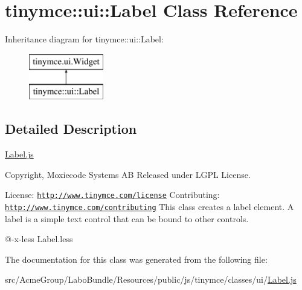 \hypertarget{classtinymce_1_1ui_1_1_label}{\section{tinymce\+:\+:ui\+:\+:Label Class Reference}
\label{classtinymce_1_1ui_1_1_label}
}
Inheritance diagram for tinymce\+:\+:ui\+:\+:Label\+:\begin{figure}[H]
\begin{center}
\leavevmode
\includegraphics[height=2.000000cm]{classtinymce_1_1ui_1_1_label}
\end{center}
\end{figure}


\subsection{Detailed Description}
\hyperlink{_label_8js}{Label.\+js}

Copyright, Moxiecode Systems A\+B Released under L\+G\+P\+L License.

License\+: \href{http://www.tinymce.com/license}{\tt http\+://www.\+tinymce.\+com/license} Contributing\+: \href{http://www.tinymce.com/contributing}{\tt http\+://www.\+tinymce.\+com/contributing} This class creates a label element. A label is a simple text control that can be bound to other controls.

@-\/x-\/less Label.\+less 

The documentation for this class was generated from the following file\+:\begin{DoxyCompactItemize}
\item 
src/\+Acme\+Group/\+Labo\+Bundle/\+Resources/public/js/tinymce/classes/ui/\hyperlink{_label_8js}{Label.\+js}\end{DoxyCompactItemize}
